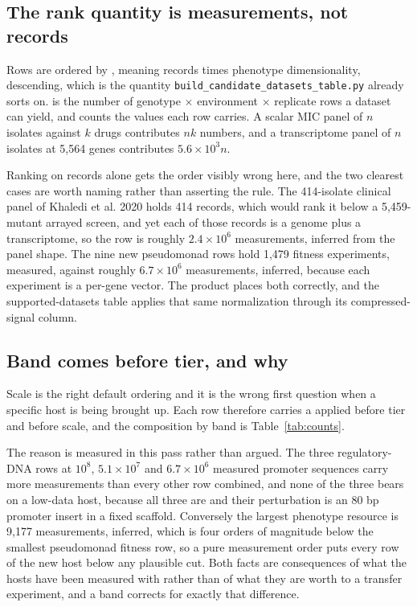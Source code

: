 \subsection{The rank quantity is measurements, not records}\label{sec:measurements}

Rows are ordered by , meaning records times phenotype dimensionality,
descending, which is the quantity \texttt{build\_candidate\_datasets\_table.py} already sorts
on.  is the number of genotype $\times$ environment $\times$ replicate rows a
dataset can yield, and  counts the values each row carries. A scalar MIC
panel of $n$ isolates against $k$ drugs contributes $nk$ numbers, and a transcriptome panel of
$n$ isolates at 5,564 genes contributes $5.6\times10^{3}n$.

Ranking on records alone gets the order visibly wrong here, and the two clearest cases are
worth naming rather than asserting the rule. The 414-isolate clinical panel of Khaledi et al.
2020 holds 414 records, which would rank it below a 5,459-mutant arrayed screen, and yet each
of those records is a genome plus a transcriptome, so the row is roughly $2.4\times10^{6}$
measurements, inferred from the panel shape. The nine new pseudomonad rows hold 1,479 fitness
experiments, measured, against roughly $6.7\times10^{6}$ measurements, inferred, because each
experiment is a per-gene vector. The product places both correctly, and the supported-datasets
table applies that same normalization through its compressed-signal column.

\subsection{Band comes before tier, and why}\label{sec:band}

Scale is the right default ordering and it is the wrong first question when a specific host is
being brought up. Each row therefore carries a  applied before tier and before
scale, and the composition by band is Table~\ref{tab:counts}.

The reason is measured in this pass rather than argued. The three regulatory-DNA rows at
$10^{8}$, $5.1\times10^{7}$ and $6.7\times10^{6}$ measured promoter sequences carry more
measurements than every other row combined, and none of the three bears on a low-data host,
because all three are  and their perturbation is an 80 bp promoter insert in
a fixed scaffold. Conversely the largest  phenotype resource is 9,177
measurements, inferred, which is four orders of magnitude below the smallest pseudomonad
fitness row, so a pure measurement order puts every row of the new host below any plausible
cut. Both facts are consequences of what the hosts have been measured with rather than of what
they are worth to a transfer experiment, and a band corrects for exactly that difference.

